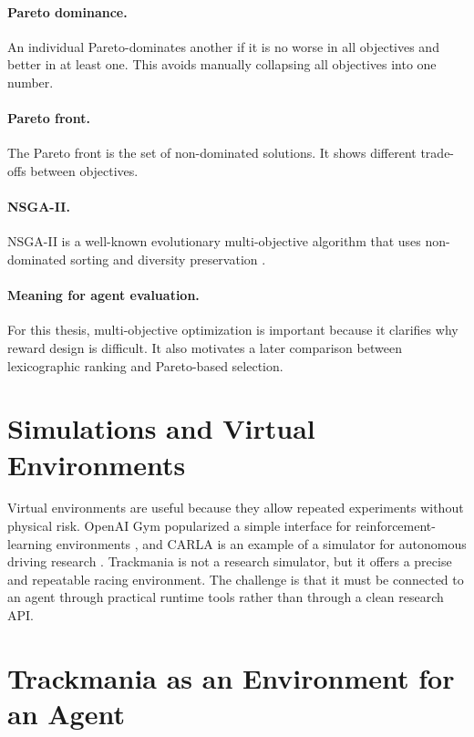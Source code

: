 \paragraph{Pareto dominance.}
An individual Pareto-dominates another if it is no worse in all objectives and better in at least one. This avoids manually collapsing all objectives into one number.

\paragraph{Pareto front.}
The Pareto front is the set of non-dominated solutions. It shows different trade-offs between objectives.

\paragraph{NSGA-II.}
NSGA-II is a well-known evolutionary multi-objective algorithm that uses non-dominated sorting and diversity preservation \cite{deb2002nsga2}.

\paragraph{Meaning for agent evaluation.}
For this thesis, multi-objective optimization is important because it clarifies why reward design is difficult. It also motivates a later comparison between lexicographic ranking and Pareto-based selection.

\section{Simulations and Virtual Environments}

Virtual environments are useful because they allow repeated experiments without physical risk. OpenAI Gym popularized a simple interface for reinforcement-learning environments \cite{brockman2016openai_gym}, and CARLA is an example of a simulator for autonomous driving research \cite{dosovitskiy2017carla}. Trackmania is not a research simulator, but it offers a precise and repeatable racing environment. The challenge is that it must be connected to an agent through practical runtime tools rather than through a clean research API.

\section{Trackmania as an Environment for an Agent}

